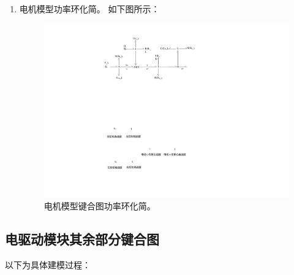 \begin{enumerate}
	\item 电机模型功率环化简。
	如下图所示：
	\begin{figure}[!h]
		\centering
		\includegraphics[width=1\textwidth]{fig/4_5_bond.pdf}
		\caption{电机模型键合图功率环化简。}\label{fig:4_5_bond}
	\end{figure}
	
\end{enumerate}

\clearpage

\subsection{电驱动模块其余部分键合图}

以下为具体建模过程：

